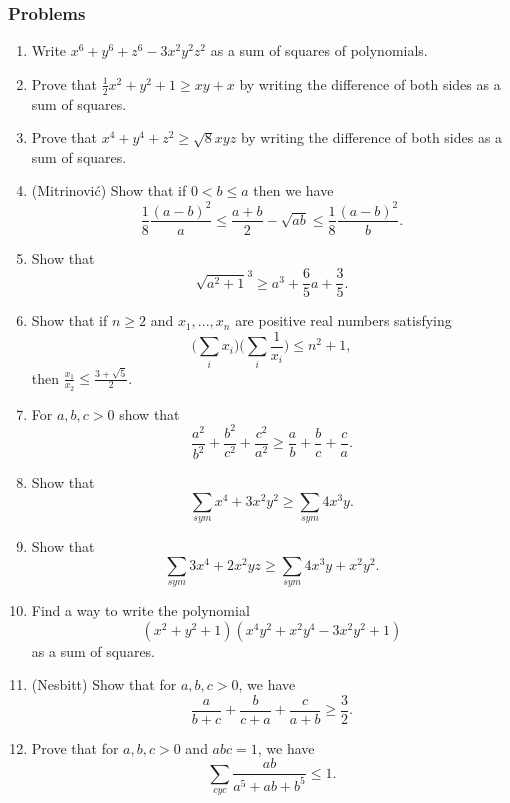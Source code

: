 \subsubsection{Problems}
\begin{enumerate}
\item Write $x^6+y^6+z^6-3x^2y^2z^2$ as a sum of squares of polynomials.

\item Prove that $\frac{1}{2}x^2+y^2+1\ge xy+x$ by writing the difference of both sides as a sum of squares.

\item Prove that $x^4+y^4+z^2 \ge \sqrt{8}xyz$ by writing the difference of both sides as a sum of squares.


\item (Mitrinovi\'c) Show that if $0 < b \le a$ then we have
\[
\frac{1}{8}\frac{(a-b)^2}{a} \le \frac{a+b}{2}-\sqrt{ab} \le \frac{1}{8}\frac{(a-b)^2}{b}.
\]

\item Show that
\[
\sqrt{a^2+1}^3 \ge a^3 + \frac{6}{5}a + \frac{3}{5}.
\]

\item Show that if $n\ge 2$ and $x_1, ..., x_n$ are positive real numbers satisfying
\[
\Big(\sum_i x_i\Big)\Big(\sum_i \frac{1}{x_i}\Big) \le n^2+1,
\]
then $\frac{x_1}{x_2} \le \frac{3+\sqrt{5}}{2}$.

\item For $a,b,c>0$ show that
\[
\frac{a^2}{b^2}+\frac{b^2}{c^2}+\frac{c^2}{a^2} \ge \frac{a}{b}+\frac{b}{c}+\frac{c}{a}.
\]

\item Show that
\[
\sum_{sym} x^4+3x^2y^2 \ge \sum_{sym} 4x^3y.
\]

\item Show that
\[
\sum_{sym} 3x^4+2x^2yz \ge \sum_{sym} 4x^3y+x^2y^2.
\]

\item Find a way to write the polynomial
\[
(x^2+y^2+1)(x^4y^2+x^2y^4-3x^2y^2+1)
\]
as a sum of squares.

\item (Nesbitt) Show that for $a,b,c > 0$, we have
\[
\frac{a}{b+c}+\frac{b}{c+a}+\frac{c}{a+b} \ge \frac{3}{2}.
\]

\item Prove that for $a,b,c > 0$ and $abc=1$, we have
\[
\sum_{cyc} \frac{ab}{a^5+ab+b^5} \le 1.
\]


\end{enumerate}
